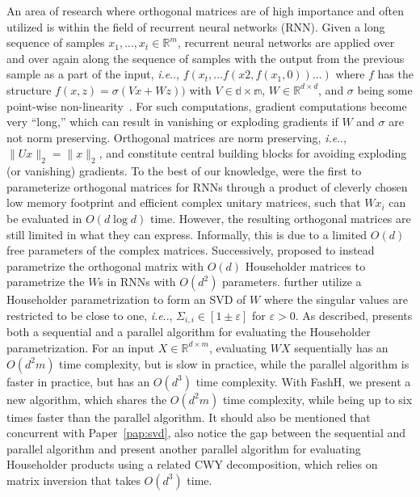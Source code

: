 \documentclass[11pt,a4paper,twoside,openright,final]{memoir}
\makeatletter
\DeclareRobustCommand\onedot{\futurelet\@let@token\@onedot}
\def\@onedot{\ifx\@let@token.\else.\null\fi\xspace}
\def\ie{\emph{i.e}\onedot} \def\Ie{\emph{I.e}\onedot}
\newcommand*{\paperref}[1]{Paper~\hyperref[#1]{\ref{#1}}}
\makeatother
\begin{document}
An area of research where orthogonal matrices are of high importance and often utilized is within the field of recurrent neural networks (RNN).
Given a long sequence of samples $x_1, ..., x_t\in\mathbb{R}^{m}$, recurrent neural networks are applied over and over again along the sequence of samples with the output from the previous sample as a part of the input, \ie, $f(x_t, ...f(x2, f(x_1, 0)) ... )$ where $f$ has the structure $f(x, z) = \sigma( Vx + Wz) )$ with $V\in \mathbb{d\times m}$, $W\in\mathbb{R}^{d\times d}$, and $\sigma$ being some point-wise non-linearity~\cite{urnn}.
For such computations, gradient computations become very ``long,'' which can result in vanishing or exploding gradients if $W$ and $\sigma$ are not norm preserving.
Orthogonal matrices are norm preserving, \ie, $\|Ux\|_2 = \|x\|_2$, and constitute central building blocks for avoiding exploding (or vanishing) gradients.
To the best of our knowledge, \citet{urnn} were the first to parameterize orthogonal matrices for RNNs through a product of cleverly chosen low memory footprint and efficient complex unitary matrices, such that $Wx_i$ can be evaluated in $O(d \log d)$ time.
However, the resulting orthogonal matrices are still limited in what they can express. 
Informally, this is due to a limited $O(d)$ free parameters of the complex matrices.
Successively, \citet{hh-rnn} proposed to instead parametrize the orthogonal matrix with $O(d)$ Householder matrices to parametrize the $W$s in RNNs with $O(d^2)$ parameters. 
\citet{sequential} further utilize a Householder parametrization to form an SVD of $W$ where the singular values are restricted to be close to one, \ie, $\Sigma_{i,i} \in [1\pm\varepsilon]$ for $\varepsilon > 0$. 
As described, \cite{sequential} presents both a sequential and a parallel algorithm for evaluating the Householder parametrization.
For an input $X\in\mathbb{R}^{d\times m}$, evaluating $WX$ sequentially has an $O(d^2m)$ time complexity, but is slow in practice, while the parallel algorithm is faster in practice, but has an $O(d^3)$ time complexity. 
With FashH, we present a new algorithm, which shares the $O(d^2m)$ time complexity, while being up to six times faster than the parallel algorithm.
It should also be mentioned that concurrent with \paperref{pap:svd}, \citet{cwy-dec} also notice the gap between the sequential and parallel algorithm and present another parallel algorithm for evaluating Householder products using a related CWY decomposition, which relies on matrix inversion that takes $O(d^3)$ time.
\end{document}
